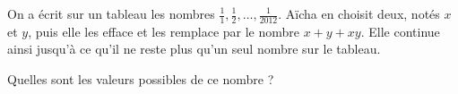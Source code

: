 \documentclass[varwidth]{standalone}
\begin{document}
    On a \'ecrit sur un tableau les nombres $\frac{1}{1}, \frac{1}{2}, \dots, \frac{1}{2012}$. A\"icha en choisit deux, not\'es $x$ et $y$, puis elle les efface et les remplace par le nombre $x + y + xy$. Elle continue ainsi jusqu'\`a ce qu'il ne reste plus qu'un seul nombre sur le tableau.

    Quelles sont les valeurs possibles de ce nombre ?
\end{document}
